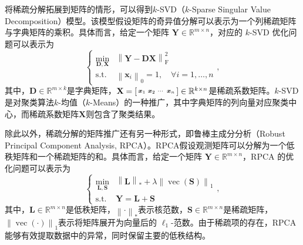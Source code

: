 将稀疏分解拓展到矩阵的情形，可以得到\( k \)-SVD（\( k \)-Sparse Singular Value Decomposition）模型。该模型假设矩阵的奇异值分解可以表示为一个列稀疏矩阵与字典矩阵的乘积。具体而言，给定一个矩阵 \( \mathbf{Y} \in \mathbb{R}^{m \times n} \)，对应的 \( k \)-SVD 优化问题可以表示为
\begin{equation}
    \begin{cases}
        \min_{\mathbf{D}, \mathbf{X}} & \left\| \mathbf{Y} - \mathbf{D} \mathbf{X} \right\|_{\mathrm{F}}^2 \\
        \text{s.t.}                   & \left\| \bm{x}_i \right\|_0 = 1, \quad \forall i = 1, \ldots, n
    \end{cases},
    \label{eq:k-svd}
\end{equation}
其中，\( \mathbf{D} \in \mathbb{R}^{m \times k} \)是字典矩阵，\( \mathbf{X} =
\begin{bsmallmatrix} \boldsymbol{x}_1 & \boldsymbol{x}_2 & \cdots & \boldsymbol{x}_n
\end{bsmallmatrix} \in \mathbb{R}^{k \times n} \)是稀疏系数矩阵。\( k \)-SVD是对聚类算法\( k \)-均值（\( k \)-Means）的一种推广，其中字典矩阵的列向量对应聚类中心，而稀疏系数矩阵\( \mathbf{X} \)则包含了聚类结果。

除此以外，稀疏分解的矩阵推广还有另一种形式，即鲁棒主成分分析（Robust Principal Component Analysis, RPCA）。RPCA假设观测矩阵可以分解为一个低秩矩阵和一个稀疏矩阵的和。具体而言，给定一个矩阵 \( \mathbf{Y} \in \mathbb{R}^{m \times n} \)，RPCA 的优化问题可以表示为
\begin{equation}
    \begin{cases}
        \min_{\mathbf{L}, \mathbf{S}} & \left\| \mathbf{L} \right\|_* + \lambda \left\| \operatorname{vec}(\mathbf{S})\right\|_1 \\
        \text{s.t.}                   & \mathbf{Y} = \mathbf{L} + \mathbf{S}
    \end{cases},
    \label{eq:rpca}
\end{equation}
其中，\( \mathbf{L} \in \mathbb{R}^{m \times n} \)是低秩矩阵，\( \left\| \cdot \right\|_* \)表示核范数，\( \mathbf{S} \in \mathbb{R}^{m \times n} \)是稀疏矩阵，\( \left\| \operatorname{vec}(\cdot)\right\|_1 \)表示将矩阵展开为向量后的 \( \ell_1 \)-范数。由于稀疏项的存在，RPCA能够有效提取数据中的异常，同时保留主要的低秩结构。

